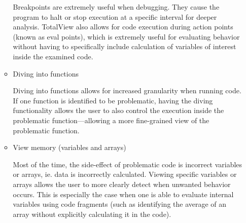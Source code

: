 \documentclass{article}
\begin{document}
\begin{enumerate}
\begin{itemize}
	Breakpoints are extremely useful when debugging. They cause the program to halt or stop execution at a specific interval for deeper analysis. TotalView also allows for code execution during action points (known as eval points), which is extremely useful for evaluating behavior without having to specifically include calculation of variables of interest inside the examined code. 
	\item Diving into functions
	
	Diving into functions allows for increased granularity when running code. If one function is identified to be problematic, having the diving functionality allows the user to also control the execution inside the problematic function---allowing a more fine-grained view of the problematic function.	
	\item View memory (variables and arrays)
	
	Most of the time, the side-effect of problematic code is incorrect variables or arrays, ie. data is incorrectly calculated. Viewing specific variables or arrays allows the user to more clearly detect when unwanted behavior occurs. This is especially the case when one is able to evaluate internal variables using code fragments (such as identifying the average of an array without explicitly calculating it in the code).

	\end{itemize}

\end{enumerate}
\end{document}
